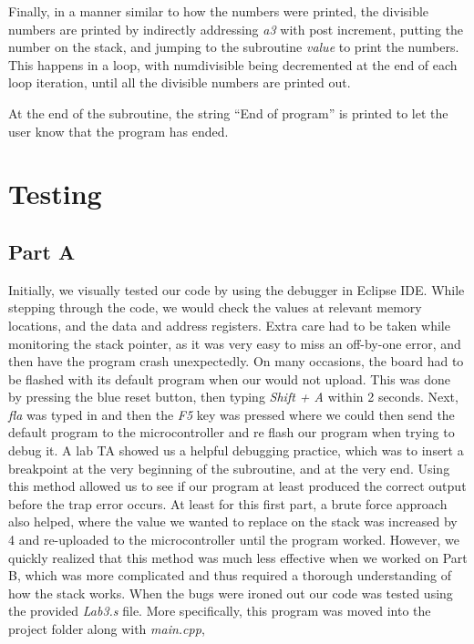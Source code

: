 \documentclass[letterpaper]{article}
\begin{document}
    Finally, in a manner similar to how the numbers were printed, the
    divisible numbers are printed by indirectly addressing \textit{a3} with post
    increment, putting the number on the stack, and jumping to the subroutine
    \textit{value} to print the numbers. This happens in a loop, with numdivisible
    being decremented at the end of each loop iteration, until all the
    divisible numbers are printed out.

    At the end of the subroutine, the string ``End of program'' is printed
    to let the user know that the program has ended.

\section{Testing}
  \subsection{Part A}
    Initially, we visually tested our code by using the debugger in Eclipse IDE.
    While stepping through the code, we would check the values at relevant memory
    locations, and the data and address registers. Extra care had to be taken
    while monitoring the stack pointer, as it was very easy to miss an off-by-one
    error, and then have the program crash unexpectedly. On many occasions, the
    board had to be flashed with its default program when our would not
    upload. This was done by pressing the blue reset button, then typing \textit{Shift + A}
    within 2 seconds. Next, \textit{fla} was typed in and then the \textit{F5} key was pressed
    where we could then send the default program to the microcontroller and
    re flash our program when trying to debug it. A lab TA showed us a helpful
    debugging practice, which was to insert a breakpoint at the very beginning
    of the subroutine, and at the very end. Using this method allowed us to see if our
    program at least produced the correct output before the trap error occurs.
    At least for this first part, a brute force approach also helped, where
    the value we wanted to replace on the stack was increased by 4 and re-uploaded to
    the microcontroller until the program worked. However, we quickly realized that
    this method was much less effective when we worked on Part B, which was more complicated
    and thus required a thorough understanding of how the stack works. When the bugs were ironed out
    our code was tested using the provided \textit{Lab3.s} file. More specifically,
    this program was moved into the project folder along with \textit{main.cpp},
\end{document}
